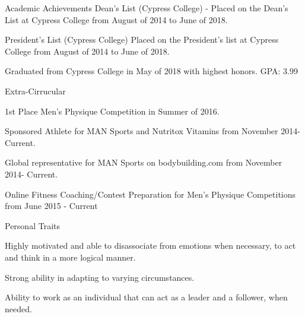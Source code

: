 \documentclass{resume} %
\begin{document}

\begin{rSection}{Academic Achievements} 
Dean's List (Cypress College) - Placed on the Dean's List at Cypress College from August of 2014 to June of 2018.
\item President's List (Cypress College) Placed on the President's list at Cypress College from August of 2014 to June of 2018.
\item Graduated from Cypress College in May of 2018 with highest honors. GPA: 3.99
\end{rSection}



\begin{rSection}{Extra-Cirrucular} \itemsep -3pt
\item 1st Place Men's Physique Competition in Summer of 2016.
\item Sponsored Athlete for MAN Sports and Nutritox Vitamins from November 2014- Current.
\item Global representative for MAN Sports on bodybuilding.com from November 2014- Current.
\item Online Fitness Coaching/Contest Preparation for Men's Physique Competitions from June 2015 - Current


\end{rSection}

\begin{rSection}{Personal Traits}
\item Highly motivated and able to disassociate from emotions when necessary, to act and think in a more logical manner.
\item Strong ability in adapting to varying circumstances.
\item Ability to work as an individual that can act as a leader and a follower, when needed.
\end{rSection}
\end{document}
